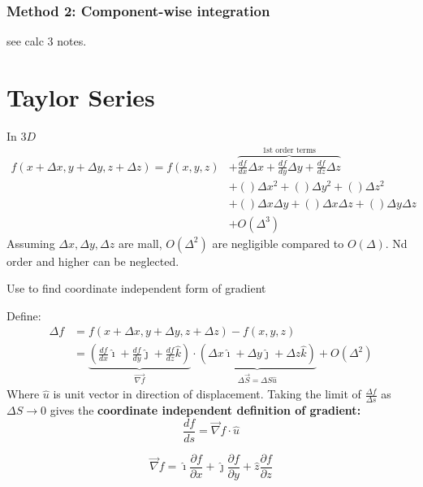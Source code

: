 \subsubsection{Method 2: Component-wise integration}
see calc 3 notes.

\section{Taylor Series}
In $ 3D $
\begin{equation}
	\begin{split}	
		f(x+\Delta x,y+\Delta y,z+\Delta z)=f(x,y,z) & +\overbrace{\frac{df}{dx}\Delta x+\frac{df}{dy}\Delta y +\frac{df}{dz}\Delta z}^{\mbox{1st order terms}}	\\
		& +()\Delta x^2 + ()\Delta y^2 + ()\Delta z^2 	\\
		& + ()\Delta x\Delta y + ()\Delta x \Delta z +()\Delta y \Delta z\\
		& + O(\Delta^{3})
	\end{split}
\end{equation}
Assuming $ \Delta x,\Delta y, \Delta z $ are mall, $ O(\Delta^2) $ are negligible compared to $ O(\Delta) $. Nd order and higher can be neglected.


Use to find coordinate independent form of gradient

Define:
\begin{equation}
\begin{split}	
	\Delta f&=f(x+\Delta x,y+\Delta y,z+\Delta z)-f(x,y,z) \\
		&=\underbrace{(\frac{df}{dx}\hat{\imath}+\frac{df}{dy}\hat{\jmath}+\frac{df}{dz}\hat{k})}_{\vec{\nabla f}} \cdot\underbrace{(\Delta x\hat{\imath}+\Delta y\hat{\jmath} +\Delta z \hat{k})}_{\Delta\vec{S}=\Delta S\hat{u}}+O(\Delta^2)
\end{split}
\end{equation}
Where $ \hat{u} $ is unit vector in direction of displacement. Taking the limit of $ \frac{\Delta f}{\Delta s} $ as $ \Delta S\to 0 $ gives the \textbf{coordinate independent definition of gradient:}
\begin{equation}
	\frac{df}{ds}=\vec{\nabla}f\cdot\hat{u}
\end{equation}

\begin{equation}
	\vec{\nabla}f=\hat{\imath}\frac{\partial f}{\partial x}+\hat{\jmath}\frac{\partial f}{\partial y}+\hat{z}\frac{\partial f}{\partial z}
\end{equation}




